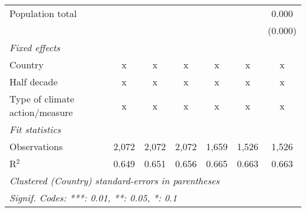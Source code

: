 \begin{tabular}{lcccccc}
   Population total                                                     &         &               &                &                &                & 0.000\\   
                                                                        &         &               &                &                &                & (0.000)\\   
   \emph{Fixed effects}\\
   Country                                                              & x       & x             & x              & x              & x              & x\\  
   Half decade                                                          & x       & x             & x              & x              & x              & x\\  
   Type of climate action/measure                                       & x       & x             & x              & x              & x              & x\\  
   \midrule \emph{Fit statistics}\\
   Observations                                                         & 2,072   & 2,072         & 2,072          & 1,659          & 1,526          & 1,526\\  
   R$^2$                                                                & 0.649   & 0.651         & 0.656          & 0.665          & 0.663          & 0.663\\  
   \midrule
   \multicolumn{7}{l}{\emph{Clustered (Country) standard-errors in parentheses}}\\
   \multicolumn{7}{l}{\emph{Signif. Codes: ***: 0.01, **: 0.05, *: 0.1}}\\
\end{tabular}
\par\endgroup


